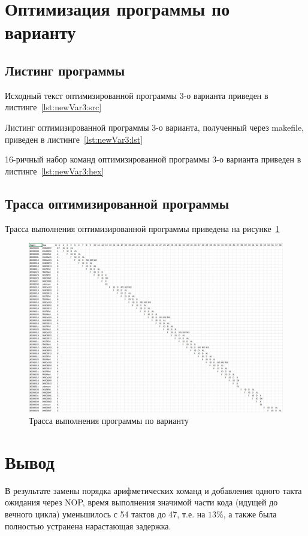 \section{Оптимизация программы по варианту}

\subsection{Листинг программы}

Исходный текст оптимизированной программы 3-о варианта приведен в листинге~\ref{lst:newVar3:src}


\clearpage

Листинг оптимизированной программы 3-о варианта, полученный через makefile, приведен в листинге~\ref{lst:newVar3:lst}



16-ричный набор команд оптимизированной программы 3-о варианта приведен в листинге~\ref{lst:newVar3:hex}


\clearpage

\subsection{Трасса оптимизированной программы}

Трасса выполнения оптимизированной программы приведена на рисунке~\ref{img:newVar3_trace}

\begin{figure}[H]
	\centering
	\includegraphics[width=1\textwidth]{images/newVar3_trace.png}
	\caption{Трасса выполнения программы по варианту}
	\label{img:newVar3_trace}
\end{figure}

\section{Вывод}

В результате замены порядка арифметических команд и добавления одного такта ожидания через NOP, время выполнения значимой части кода (идущей до вечного цикла) уменьшилось с 54 тактов до 47, т.е. на $13$\%, а также была полностью устранена нарастающая задержка.

\clearpage
